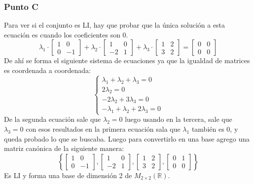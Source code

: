 \documentclass[a4paper,12pt]{article}
\begin{document}
\subsubsection{Punto C}
Para ver si el conjunto es LI, hay que probar que la única solución a esta ecuación es cuando los coeficientes son 0.
$$
\lambda_1\cdot 
\begin{bmatrix}
1 & 0\\ 
0 & -1
\end{bmatrix}
+ \lambda_2 \cdot
\begin{bmatrix}
1 & 0\\ 
-2 & 1
\end{bmatrix}
+ \lambda_3 \cdot
\begin{bmatrix}
1 & 2\\ 
3 & 2
\end{bmatrix}
= 
\begin{bmatrix}
0 & 0\\ 
0 & 0
\end{bmatrix}
$$
De ahí se forma el siguiente sistema de ecuaciones ya que la igualdad de matrices es coordenada a coordenada:
$$
\left\{\begin{matrix}
\lambda_1 + \lambda_2 + \lambda_3 = 0\\ 
2\lambda_2 = 0\\ 
-2\lambda_2 + 3 \lambda_3 = 0\\ 
-\lambda_1+\lambda_2+2\lambda_3 = 0
\end{matrix}\right.
$$
De la segunda ecuación sale que $\lambda_2=0$ luego usando en la tercera, sale que $\lambda_3=0$ con esos resultados en la primera ecuación sala que $\lambda_1$ también es 0, y queda probado lo que se buscaba. Luego para convertirlo en una base agrego una matriz canónica de la siguiente manera:
$$
\left \{ 
\begin{bmatrix}
1 & 0\\ 
0 & -1
\end{bmatrix}, 
\begin{bmatrix}
1 & 0\\ 
-2 & 1
\end{bmatrix}, 
\begin{bmatrix}
1 & 2\\ 
3 & 2
\end{bmatrix},
\begin{bmatrix}
0 & 1\\ 
0 & 0
\end{bmatrix}
\right \}
$$
Es LI y forma una base de dimensión 2 de $ M_{2\times 2}(\mathds{R})$.
\newpage
\end{document}
